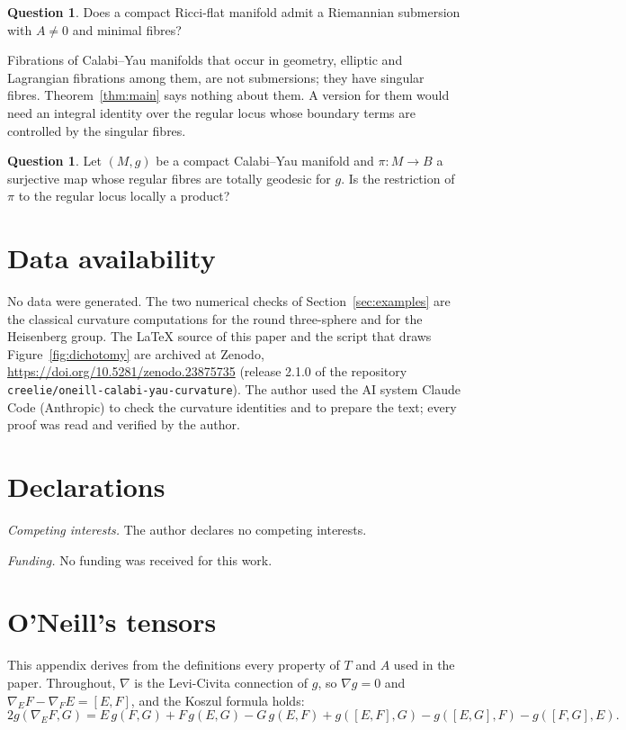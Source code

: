 \documentclass[11pt,reqno]{amsart}
\theoremstyle{plain}
\theoremstyle{definition}
\newtheorem{question}[theorem]{Question}
\begin{document}
\begin{question}
Does a compact Ricci-flat manifold admit a Riemannian submersion with $A\neq0$ and minimal fibres?
\end{question}

Fibrations of Calabi--Yau manifolds that occur in geometry, elliptic and Lagrangian fibrations among them, are not submersions; they have singular fibres. Theorem~\ref{thm:main} says nothing about them. A version for them would need an integral identity over the regular locus whose boundary terms are controlled by the singular fibres.

\begin{question}
Let $(M,g)$ be a compact Calabi--Yau manifold and $\pi\colon M\to B$ a surjective map whose regular fibres are totally geodesic for $g$. Is the restriction of $\pi$ to the regular locus locally a product?
\end{question}

\section*{Data availability}

No data were generated. The two numerical checks of Section~\ref{sec:examples} are the classical curvature computations for the round three-sphere and for the Heisenberg group. The \LaTeX{} source of this paper and the script that draws Figure~\ref{fig:dichotomy} are archived at Zenodo, \url{https://doi.org/10.5281/zenodo.23875735} (release 2.1.0 of the repository \texttt{creelie/oneill-calabi-yau-curvature}). The author used the AI system Claude Code (Anthropic) to check the curvature identities and to prepare the text; every proof was read and verified by the author.

\section*{Declarations}

\noindent\textit{Competing interests.} The author declares no competing interests.

\noindent\textit{Funding.} No funding was received for this work.

\appendix

\section{O'Neill's tensors}\label{app:oneill}

This appendix derives from the definitions every property of $T$ and $A$ used in the paper. Throughout, $\nabla$ is the Levi-Civita connection of $g$, so $\nabla g=0$ and $\nabla_EF-\nabla_FE=[E,F]$, and the Koszul formula holds:
\begin{equation}\label{eq:koszul}
2g(\nabla_EF,G)=E\,g(F,G)+F\,g(E,G)-G\,g(E,F)+g([E,F],G)-g([E,G],F)-g([F,G],E).
\end{equation}
\end{document}
